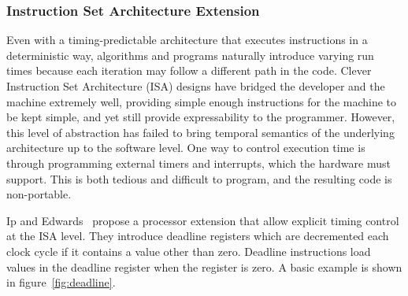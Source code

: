\documentclass[times, 10pt,twocolumn]{article}
\begin{document}
\subsubsection {Instruction Set Architecture Extension}
Even with a timing-predictable architecture that executes instructions in a deterministic way, algorithms and programs naturally introduce varying run times because each iteration may follow a different path in the code. Clever Instruction Set Architecture (ISA) designs have bridged the developer and the machine extremely well, providing simple enough instructions for the machine to be kept simple, and yet still provide expressability to the programmer. However, this level of abstraction has failed to bring temporal semantics of the underlying architecture up to the software level. One way to control execution time is through programming external timers and interrupts, which the hardware must support. This is both tedious and difficult to program, and the resulting code is non-portable. 

Ip and Edwards~\cite{ip2006processor} propose a processor extension that allow explicit timing control at the ISA level. They introduce deadline registers which are decremented each clock cycle if it contains a value other than zero. Deadline instructions load values in the deadline register when the register is zero. A basic example is shown in figure~\ref{fig:deadline}.
\end{document}
